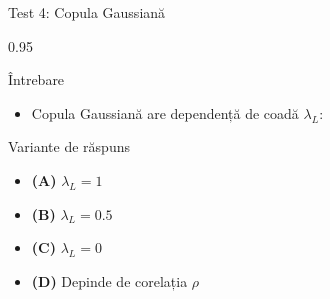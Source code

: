 \documentclass[9pt, aspectratio=169, t]{beamer}
\begin{document}
\begin{frame}{Test 4: Copula Gaussiană}
    \begin{cminipage}{0.95\textwidth}
    \begin{alertblock}{Întrebare}
        \begin{itemize}\setlength{\itemsep}{0pt}
            \item Copula Gaussiană are dependență de coadă $\lambda_L$:
        \end{itemize}
    \end{alertblock}

    \begin{block}{Variante de răspuns}
    \begin{itemize}\setlength{\itemsep}{0pt}
        \item \textcolor{MainBlue}{\textbf{(A)}} $\lambda_L = 1$
        \item \textcolor{MainBlue}{\textbf{(B)}} $\lambda_L = 0.5$
        \item \textcolor{MainBlue}{\textbf{(C)}} $\lambda_L = 0$
        \item \textcolor{MainBlue}{\textbf{(D)}} Depinde de corelația $\rho$
    \end{itemize}
    \end{block}
    \end{cminipage}
\end{frame}
\end{document}
